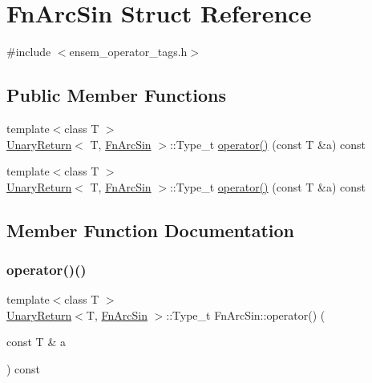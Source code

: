 \hypertarget{structFnArcSin}{}\section{Fn\+Arc\+Sin Struct Reference}
\label{structFnArcSin}


{\ttfamily \#include $<$ensem\+\_\+operator\+\_\+tags.\+h$>$}

\subsection*{Public Member Functions}
\begin{DoxyCompactItemize}
\item 
{\footnotesize template$<$class T $>$ }\\\mbox{\hyperlink{structUnaryReturn}{Unary\+Return}}$<$ T, \mbox{\hyperlink{structFnArcSin}{Fn\+Arc\+Sin}} $>$\+::Type\+\_\+t \mbox{\hyperlink{structFnArcSin_a12cc5b8e1ae14e2bdb4a9ec3be431874}{operator()}} (const T \&a) const
\item 
{\footnotesize template$<$class T $>$ }\\\mbox{\hyperlink{structUnaryReturn}{Unary\+Return}}$<$ T, \mbox{\hyperlink{structFnArcSin}{Fn\+Arc\+Sin}} $>$\+::Type\+\_\+t \mbox{\hyperlink{structFnArcSin_a12cc5b8e1ae14e2bdb4a9ec3be431874}{operator()}} (const T \&a) const
\end{DoxyCompactItemize}


\subsection{Member Function Documentation}
\mbox{\label{structFnArcSin_a12cc5b8e1ae14e2bdb4a9ec3be431874}} 
\subsubsection{\texorpdfstring{operator()()}{operator()()}\hspace{0.1cm}{\footnotesize\ttfamily [1/2]}}
{\footnotesize\ttfamily template$<$class T $>$ \\
\mbox{\hyperlink{structUnaryReturn}{Unary\+Return}}$<$T, \mbox{\hyperlink{structFnArcSin}{Fn\+Arc\+Sin}} $>$\+::Type\+\_\+t Fn\+Arc\+Sin\+::operator() (\begin{DoxyParamCaption}\item[{const T \&}]{a }\end{DoxyParamCaption}) const\hspace{0.3cm}{\ttfamily [inline]}}

